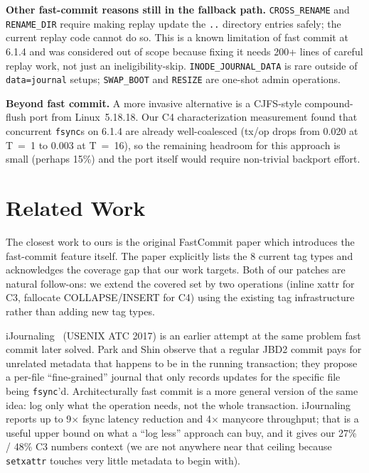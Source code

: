 \documentclass[11pt,a4paper]{article}
\begin{document}
\textbf{Other fast-commit reasons still in the fallback path.}
\texttt{CROSS\_RENAME} and \texttt{RENAME\_DIR} require making
replay update the \texttt{..} directory entries safely; the current
replay code cannot do so. This is a known limitation of fast
commit at 6.1.4 and was considered out of scope because fixing it
needs 200+ lines of careful replay work, not just an
ineligibility-skip. \texttt{INODE\_JOURNAL\_DATA} is rare outside
of \texttt{data=journal} setups; \texttt{SWAP\_BOOT} and
\texttt{RESIZE} are one-shot admin operations.

\textbf{Beyond fast commit.} A more invasive alternative is a
CJFS-style compound-flush port from Linux~5.18.18. Our C4
characterization measurement found that concurrent \texttt{fsync}s
on 6.1.4 are already well-coalesced (tx/op drops from 0.020 at
T~=~1 to 0.003 at T~=~16), so the remaining headroom for this
approach is small (perhaps 15\%) and the port itself would
require non-trivial backport effort.

\section{Related Work}

The closest work to ours is the original FastCommit paper
\cite{atc24-fc} which introduces the fast-commit feature itself.
The paper explicitly lists the 8 current tag types and acknowledges
the coverage gap that our work targets. Both of our patches are
natural follow-ons: we extend the covered set by two operations
(inline xattr for C3, fallocate COLLAPSE/INSERT for C4) using the
existing tag infrastructure rather than adding new tag types.

iJournaling~\cite{ijournaling} (USENIX ATC 2017) is an earlier
attempt at the same problem fast commit later solved. Park and
Shin observe that a regular JBD2 commit pays for unrelated metadata
that happens to be in the running transaction; they propose a
per-file ``fine-grained'' journal that only records updates for
the specific file being \texttt{fsync}'d. Architecturally fast
commit is a more general version of the same idea: log only what
the operation needs, not the whole transaction. iJournaling
reports up to 9$\times$ fsync latency reduction and 4$\times$
manycore throughput; that is a useful upper bound on what a
``log less'' approach can buy, and it gives our 27\% / 48\% C3
numbers context (we are not anywhere near that ceiling because
\texttt{setxattr} touches very little metadata to begin with).
\end{document}
